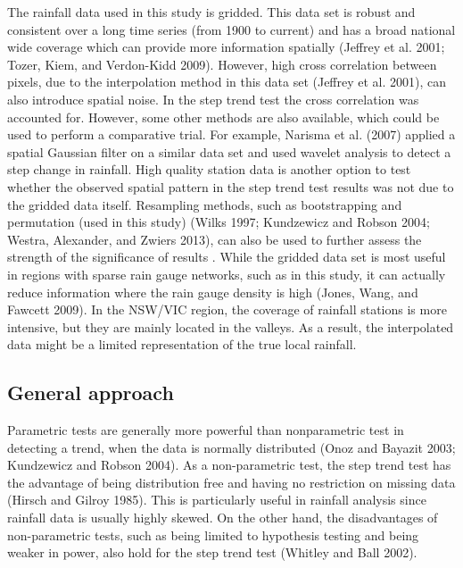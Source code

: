 \documentclass[fleqn,10pt,lineno]{wlpeerj} %
\begin{document}
The rainfall data used in this study is gridded. This data set is robust
and consistent over a long time series (from 1900 to current) and has a
broad national wide coverage which can provide more information
spatially (Jeffrey et al. 2001; Tozer, Kiem, and Verdon-Kidd 2009).
However, high cross correlation between pixels, due to the interpolation
method in this data set (Jeffrey et al. 2001), can also introduce
spatial noise. In the step trend test the cross correlation was
accounted for. However, some other methods are also available, which
could be used to perform a comparative trial. For example, Narisma et
al. (2007) applied a spatial Gaussian filter on a similar data set and
used wavelet analysis to detect a step change in rainfall. High quality
station data is another option to test whether the observed spatial
pattern in the step trend test results was not due to the gridded data
itself. Resampling methods, such as bootstrapping and permutation (used
in this study) (Wilks 1997; Kundzewicz and Robson 2004; Westra,
Alexander, and Zwiers 2013), can also be used to further assess the
strength of the significance of results . While the gridded data set is
most useful in regions with sparse rain gauge networks, such as in this
study, it can actually reduce information where the rain gauge density
is high (Jones, Wang, and Fawcett 2009). In the NSW/VIC region, the
coverage of rainfall stations is more intensive, but they are mainly
located in the valleys. As a result, the interpolated data might be a
limited representation of the true local rainfall.

\subsection{General approach}\label{general-approach}

Parametric tests are generally more powerful than nonparametric test in
detecting a trend, when the data is normally distributed (Onoz and
Bayazit 2003; Kundzewicz and Robson 2004). As a non-parametric test, the
step trend test has the advantage of being distribution free and having
no restriction on missing data (Hirsch and Gilroy 1985). This is
particularly useful in rainfall analysis since rainfall data is usually
highly skewed. On the other hand, the disadvantages of non-parametric
tests, such as being limited to hypothesis testing and being weaker in
power, also hold for the step trend test (Whitley and Ball 2002).
\end{document}
